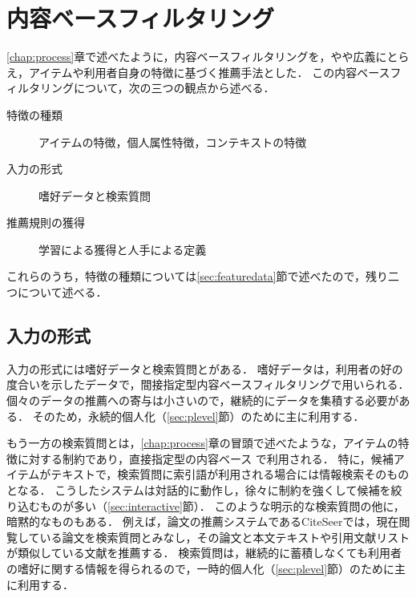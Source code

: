 \chapter{内容ベースフィルタリング}
\label{chap:cbf}

\ref{chap:process}章で述べたように，内容ベースフィルタリングを，やや広義にとらえ，アイテムや利用者自身の特徴に基づく推薦手法とした．
この内容ベースフィルタリングについて，次の三つの観点から述べる．
\begin{description}
 \item[特徴の種類] アイテムの特徴，個人属性特徴，コンテキストの特徴
 \item[入力の形式] 嗜好データと検索質問
 \item[推薦規則の獲得] 学習による獲得と人手による定義
\end{description}
これらのうち，特徴の種類については\ref{sec:featuredata}節で述べたので，残り二つについて述べる．


\section{入力の形式}
\label{sec:cbfinput}

入力の形式には嗜好データと検索質問とがある．
嗜好データは，利用者の好の度合いを示したデータで，間接指定型内容ベースフィルタリング\cite{misc:091,tjsai:05:05,trjsai:06:01}で用いられる．
個々のデータの推薦への寄与は小さいので，継続的にデータを集積する必要がある．
そのため，永続的個人化（\ref{sec:plevel}節）のために主に利用する．

もう一方の検索質問とは，\ref{chap:process}章の冒頭で述べたような，アイテムの特徴に対する制約であり，直接指定型の内容ベース
\cite{ec:024,ijcai:03:04,jair:04:01,ieeem:07:06}で利用される．
特に，候補アイテムがテキストで，検索質問に索引語が利用される場合には情報検索\cite{jb:012:00}そのものとなる．
こうしたシステムは対話的に動作し，徐々に制約を強くして候補を絞り込むものが多い（\ref{sec:interactive}節）．
このような明示的な検索質問の他に，暗黙的なものもある．
例えば，論文の推薦システムであるCiteSeer\cite{ieeem:99:02}では，現在閲覧している論文を検索質問とみなし，その論文と本文テキストや引用文献リストが類似している文献を推薦する．
検索質問は，継続的に蓄積しなくても利用者の嗜好に関する情報を得られるので，一時的個人化（\ref{sec:plevel}節）のために主に利用する．


